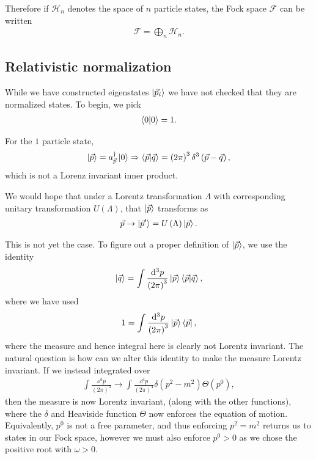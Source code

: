 Therefore if $\mathscr{H}_n$ denotes the space of $n$ particle states, the Fock space $\mathscr{F}$ can be written
\begin{align}
    \mathscr{F} = \bigoplus_{n} \mathscr{H}_n
.\end{align}

\subsection{Relativistic normalization}

While we have constructed eigenstates $\ket{\vec{p}_i}$ we have not checked that they are normalized states. To begin, we pick
\begin{align}
    \bra{0} \ket{0} = 1
.\end{align}

For the $1$ particle state,
\begin{align}
    \ket{\vec{p}} = a^{\dag}_{\vec{p}} \ket{0} \Rightarrow \bra{\vec{p}} \ket{\vec{q}} = \left( 2\pi \right)^3 \delta^{3} \left( \vec{p} - \vec{q} \right) 
,\end{align}
which is not a Lorenz invariant inner product.

We would hope that under a Lorentz transformation $\Lambda$ with corresponding unitary transformation $U \left( \Lambda \right) $, that $\ket{\vec{p}}$ transforms as
\begin{align}
    \vec{p} \to \ket{\vec{p}'} = U \left( \Lambda \right) \ket{\vec{p}}
.\end{align}

This is not yet the case. To figure out a proper definition of $\ket{\vec{p}}$, we use the identity
\begin{align}
    \ket{\vec{q}} = \int \frac{\dd{^3p}}{\left( 2\pi \right)^3} \ket{\vec{p}} \bra{\vec{p}} \ket{\vec{q}}
,\end{align}
where we have used
\begin{align}
    1 = \int \frac{\dd{^3p}}{\left( 2\pi \right)^3} \ket{\vec{p}} \bra{\vec{p}}
,\end{align}
where the measure and hence integral here is clearly not Lorentz invariant. The natural question is how can we alter this identity to make the measure Lorentz invariant. If we instead integrated over
\begin{align}
    \int \frac{\dd{^3p}}{\left( 2\pi \right)^3} \to \int \frac{\dd{^{4}p}}{\left( 2\pi \right)^{4}} \delta \left( p^2 - m^2 \right)  \Theta \left( p^0 \right) 
,\end{align}
then the measure is now Lorentz invariant, (along with the other functions), where the $\delta $ and Heaviside function $\Theta$ now enforces the equation of motion. Equivalently, $p^{0}$ is not a free parameter, and thus enforcing $p^2 = m^2$ returns us to states in our Fock space, however we must also enforce $p^{0} > 0$ as we chose the positive root with $\omega > 0$.

